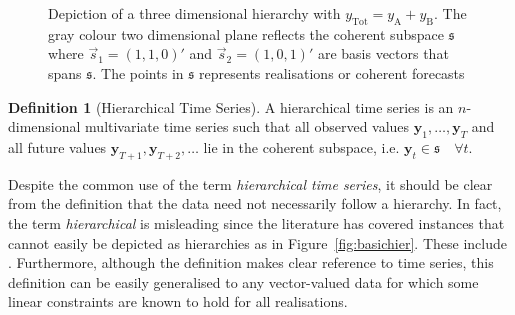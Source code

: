 \documentclass[12pt]{article}
\theoremstyle{definition}
\newtheorem{definition}{Definition}[section]
\theoremstyle{property}
\begin{document}
     		\begin{figure}[H]
     	\centering
     	\vspace{-0.9cm}
     	\small
     	\resizebox{\linewidth}{!}{
     		
     	}
     	\caption{Depiction of a three dimensional hierarchy with $y_{\text{Tot}} = y_{\text{A}} + y_{\text{B}}$. The gray colour two dimensional plane reflects the coherent subspace $\mathfrak{s}$ where $\vec{s}_1 = (1,1,0)'$ and $\vec{s}_2 = (1, 0, 1)'$ are basis vectors that spans $\mathfrak{s}$. The points in $\mathfrak{s}$ represents realisations or coherent forecasts}\label{fig:3D_hierarchy}
     \end{figure}
     
	 \begin{definition}[Hierarchical Time Series]\label{def:cohspace}
	 	A hierarchical time series is an $n$-dimensional multivariate time series such that all observed values $\bm{y}_1,\ldots,\bm{y}_T$ and all future values $\bm{y}_{T+1},\bm{y}_{T+2},\ldots$  lie in the coherent subspace, i.e. $\bm{y}_t\in\mathfrak{s}\quad\forall t$.
	 \end{definition}
	 
	 Despite the common use of the term {\em hierarchical time series}, it should be clear from the definition that the data need not necessarily follow a hierarchy.   In fact, the term {\em hierarchical} is misleading since the literature has covered instances that cannot easily be depicted as hierarchies as in Figure~\ref{fig:basichier}.  These include .  Furthermore, although the definition makes clear reference to time series, this definition can be easily generalised to any vector-valued data for which some linear constraints are known to hold for all realisations.
	 
	 
	 
\end{document}
